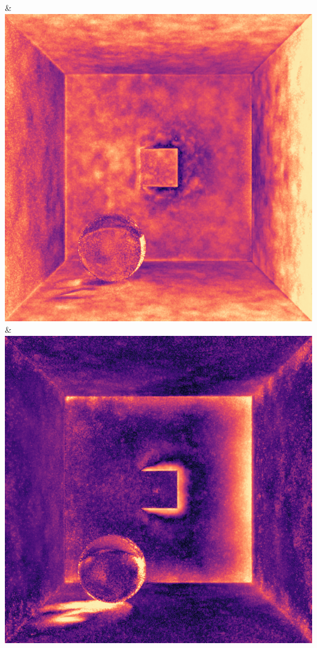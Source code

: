 & \includegraphics[width=\linewidth]{figures/py/tests/quality_comparison/nrc+pt+sl_1spp_ajar_caustic_flip.png}
& \includegraphics[width=\linewidth]{figures/py/tests/quality_comparison/nrc+bt_1spp_ajar_caustic_flip.png}

